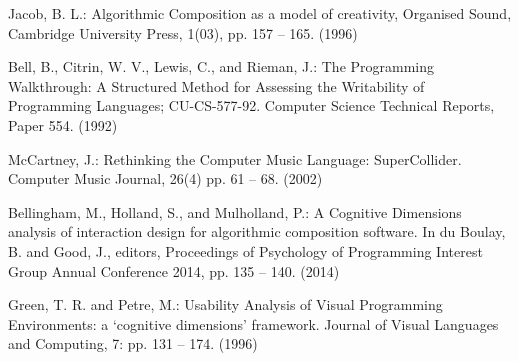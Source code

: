 \documentclass[runningheads,a4paper]{llncs}
\begin{document}
\begin{thebibliography}{4}

 Jacob, B. L.: Algorithmic Composition as a model of creativity, Organised Sound, Cambridge University Press, 1(03), pp. 157 -- 165. (1996)

 Bell, B., Citrin, W. V., Lewis, C., and Rieman, J.: The Programming Walkthrough: A Structured Method for Assessing the Writability of Programming Languages; CU-CS-577-92. Computer Science Technical Reports, Paper 554. (1992)

 McCartney, J.: Rethinking the Computer Music Language: SuperCollider. Computer Music Journal, 26(4) pp. 61 -- 68. (2002)

 Bellingham, M., Holland, S., and Mulholland, P.: A Cognitive Dimensions analysis of interaction design for algorithmic composition software. In du Boulay, B. and Good, J., editors, Proceedings of Psychology of Programming Interest Group Annual Conference 2014, pp.  135 -- 140. (2014)

 Green, T. R. and Petre, M.:  Usability Analysis of Visual Programming Environments: a `cognitive dimensions' framework. Journal of Visual Languages and Computing, 7: pp. 131 -- 174. (1996)

\end{thebibliography}
\end{document}
